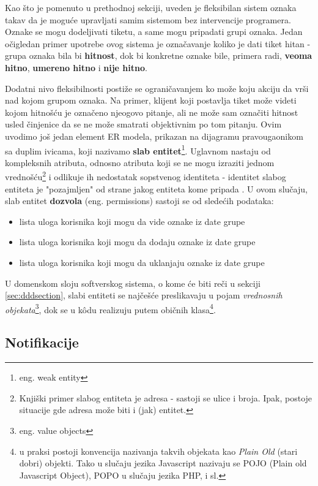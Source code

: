 \documentclass[12pt,oneside]{memoir}
\begin{document}
Kao što je pomenuto u prethodnoj sekciji, uveden je fleksibilan sistem oznaka takav da je moguće upravljati samim sistemom bez intervencije programera. Oznake se mogu dodeljivati tiketu, a same mogu pripadati grupi oznaka. Jedan očigledan primer upotrebe ovog sistema je označavanje koliko je dati tiket hitan - grupa oznaka bila bi \textbf{hitnost}, dok bi konkretne oznake bile, primera radi, \textbf{veoma hitno}, \textbf{umereno hitno} i \textbf{nije hitno}.

Dodatni nivo fleksibilnosti postiže se ograničavanjem ko može koju akciju da vrši nad kojom grupom oznaka. Na primer, klijent koji postavlja tiket može videti kojom hitnošću je označeno njeogovo pitanje, ali ne može sam označiti hitnost usled činjenice da se ne može smatrati objektivnim po tom pitanju. Ovim uvodimo još jedan element ER modela, prikazan na dijagramu pravougaonikom sa duplim ivicama, koji nazivamo \textbf{slab entitet}\footnote{eng. weak entity}. Uglavnom nastaju od kompleksnih atributa, odnosno atributa koji se ne mogu izraziti jednom vrednošću\footnote{Knjiški primer slabog entiteta je adresa - sastoji se ulice i broja. Ipak, postoje situacije gde adresa može biti i (jak) entitet.} i odlikuje ih nedostatak sopstvenog identiteta - identitet slabog entiteta je "pozajmljen" od strane jakog entiteta kome pripada \cite{dbmodelinganddesign}. U ovom slučaju, slab entitet \textbf{dozvola} (eng. permissions) sastoji se od sledećih podataka:
\begin{itemize}
    \item lista uloga korisnika koji mogu da vide oznake iz date grupe
    \item lista uloga korisnika koji mogu da dodaju oznake iz date grupe
    \item lista uloga korisnika koji mogu da uklanjaju oznake iz date grupe
\end{itemize}

U domenskom sloju softverskog sistema, o kome će biti reči u sekciji \ref{sec:dddsection}, slabi entiteti se najčešće preslikavaju u pojam \textit{vrednosnih objekata}\footnote{eng. value objects}, dok se u k\^{o}du realizuju putem običnih klasa\footnote{u praksi postoji konvencija nazivanja takvih objekata kao \textit{Plain Old} (stari dobri) objekti. Tako u slučaju jezika Javascript nazivaju se POJO (Plain old Javascript Object), POPO u slučaju jezika PHP, i sl.}.

\newpage
\subsection{Notifikacije}
\end{document}
